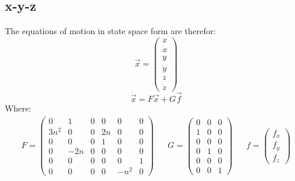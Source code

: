 \documentclass[11pt, a4paper]{article}
\begin{document}
\subsection{x-y-z}
The equations of motion in state space form are therefor:
\begin{equation}
    \vec{x} = \begin{pmatrix}
        x\\\dot{x}\\y\\\dot{y}\\z\\\dot{z}
    \end{pmatrix}
\end{equation}
\begin{equation}
    \dot{\vec{x}}=F\vec{x}+G\vec{f}
\end{equation}
Where:
\begin{equation}
    \begin{matrix}
        F=\begin{pmatrix}
            0 & 1 & 0 & 0 & 0 & 0 \\
            3n^2 & 0 & 0 & 2n & 0 & 0 \\
            0 & 0 & 0 & 1 & 0 & 0 \\
            0 & -2n & 0 & 0 & 0 & 0 \\
            0 & 0 & 0 & 0 & 0 & 1 \\
            0 & 0 & 0 & 0 & -n^2 & 0 
        \end{pmatrix} && G=\begin{pmatrix}
            0 & 0 & 0\\
            1 & 0 & 0\\
            0 & 0 & 0\\
            0 & 1 & 0\\
            0 & 0 & 0\\
            0 & 0 & 1
        \end{pmatrix} && f=\begin{pmatrix}
            f_x\\f_y\\f_z
        \end{pmatrix}
    \end{matrix}
\end{equation}
\end{document}
